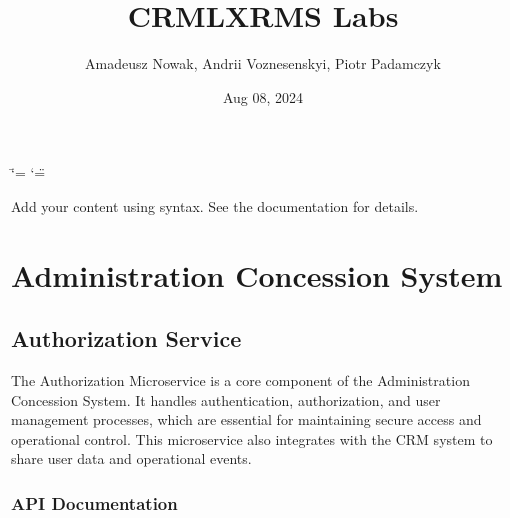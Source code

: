 \documentclass[letterpaper,10pt,english]{sphinxmanual}
\title{CRMLXRMS Labs}
\date{Aug 08, 2024}
\author{Amadeusz Nowak, Andrii Voznesenskyi, Piotr Padamczyk}
\begin{document}
\ifdefined\shorthandoff
  \ifnum\catcode`\=\string=\active\shorthandoff{=}\fi
  \ifnum\catcode`\"=\active{}\fi
\fi

\pagestyle{empty}
\sphinxmaketitle
\pagestyle{plain}
\sphinxtableofcontents
\pagestyle{normal}
\label{\detokenize{index::doc}}


\sphinxAtStartPar
Add your content using  syntax. See the
documentation for details.

\sphinxstepscope


\chapter{Administration Concession System}
\label{\detokenize{administration_concession_system/index:administration-concession-system}}\label{\detokenize{administration_concession_system/index::doc}}
\sphinxstepscope


\section{Authorization Service}
\label{\detokenize{administration_concession_system/authorization_service:authorization-service}}\label{\detokenize{administration_concession_system/authorization_service::doc}}
\sphinxAtStartPar
The Authorization Microservice is a core component of the Administration Concession System. It handles authentication, authorization, and user management processes, which are essential for maintaining secure access and operational control. This microservice also integrates with the CRM system to share user data and operational events.



\subsection{API Documentation}
\label{\detokenize{administration_concession_system/authorization_service:api-documentation}}
\end{document}
